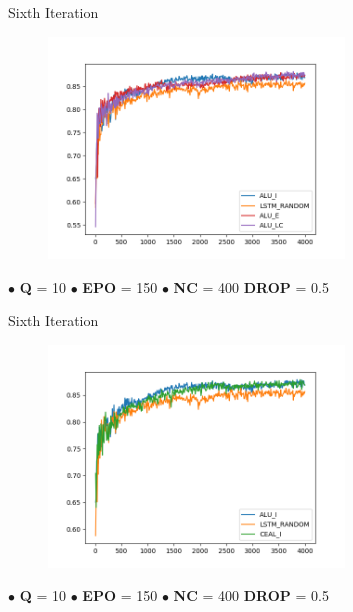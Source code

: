 \documentclass[10pt]{beamer}
\begin{document}
\begin{frame}[fragile]{Sixth Iteration}
\begin{figure}[H]
    \centering
    \includegraphics[width=0.7\textwidth]{images/subj_n150_q10_full_comparison}
\end{figure}

\hspace{0.5cm} $\bullet$ \textbf{Q} = 10 \hspace{0.5cm} $\bullet$ \textbf{EPO} = 150 \hspace{0.5cm} $\bullet$ \textbf{NC} = 400 \hspace{0.5cm} \textbf{DROP} = 0.5
\end{frame}

\begin{frame}[fragile]{Sixth Iteration}
\begin{figure}[H]
    \centering
    \includegraphics[width=0.7\textwidth]{images/subj_n150_q10_ceal_comparison}
\end{figure}

\hspace{0.5cm} $\bullet$ \textbf{Q} = 10 \hspace{0.5cm} $\bullet$ \textbf{EPO} = 150 \hspace{0.5cm} $\bullet$ \textbf{NC} = 400 \hspace{0.5cm} \textbf{DROP} = 0.5
\end{frame}
\end{document}
